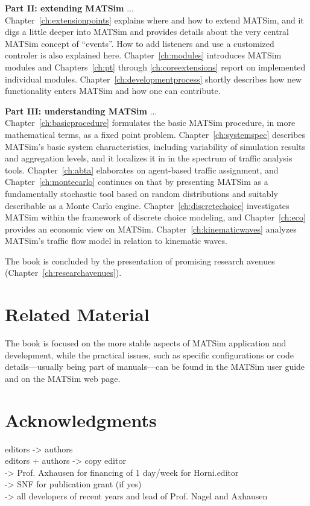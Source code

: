 \textbf{Part II: extending MATSim} ... \\
Chapter~\ref{ch:extensionpoints} explains where and how to extend MATSim, and it digs a little deeper into MATSim and provides details about the very central MATSim concept of ``events''. How to add listeners and use a customized controler is also explained here. Chapter~\ref{ch:modules} introduces MATSim modules and Chapters~\ref{ch:pt} through \ref{ch:coreextensions} report on implemented individual modules. Chapter~\ref{ch:developmentprocess} shortly describes how new functionality enters MATSim and how one can contribute.

\textbf{Part III: understanding MATSim} ... \\
Chapter~\ref{ch:basicprocedure} formulates the basic MATSim procedure, in more mathematical terms, as a fixed point problem. Chapter~\ref{ch:systemspec} describes MATSim's basic system characteristics, including variability of simulation results and aggregation levels, and it localizes it in in the spectrum of traffic analysis tools. Chapter~\ref{ch:abta} elaborates on agent-based traffic assignment, and Chapter~\ref{ch:montecarlo} continues on that by presenting MATSim as a fundamentally stochastic tool based on random distributions and suitably describable as a Monte Carlo engine. Chapter~\ref{ch:discretechoice} investigates MATSim within the framework of discrete choice modeling, and Chapter~\ref{ch:eco} provides an economic view on MATSim. Chapter~\ref{ch:kinematicwaves} analyzes MATSim's traffic flow model in relation to kinematic waves.

The book is concluded by the presentation of promising research avenues (Chapter~\ref{ch:researchavenues}).

\section*{Related Material}
The book is focused on the more stable aspects of MATSim application and development, while the practical issues, such as specific configurations or code details---usually being part of manuals---can be found in the MATSim user guide \citep[][]{MATSim_Userguide_2014} and on the MATSim web page.

\section*{Acknowledgments}
editors -> authors \\
editors + authors -> copy editor \\
-> Prof. Axhausen for financing of 1 day/week for Horni.editor\\
-> SNF for publication grant (if yes) \\
-> all developers of recent years and lead of Prof. Nagel and Axhausen

